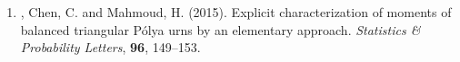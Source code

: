 \begin{enumerate}[series=journalpubs]

\item\begin{pubentry} \PZ{}, Chen, C. and Mahmoud, H. (2015). Explicit characterization of moments of balanced triangular P\'{o}lya urns by an elementary approach. \emph{Statistics \& Probability Letters}, \textbf{96}, 149--153.
\par\end{pubentry}
\end{enumerate}
